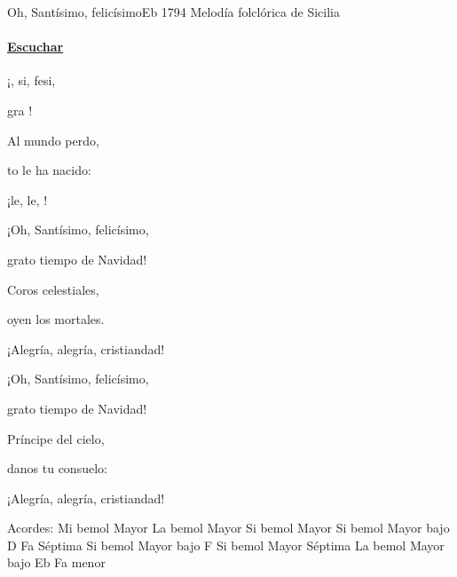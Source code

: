 \documentclass[12pt, spanish]{book}
\newcommand{\NotCCLIed}{\relax}
\begin{document}
    \begin{song}{Oh, Santísimo, felicísimo}{Eb}
    {1794} %
    {Melodía folclórica de Sicilia}
    {} %
    {} %
        \ifChordBk
            \paragraph{\mbox{}\hfill\protect\href{https://open.spotify.com/intl-es/track/0Mr8xSpK0KZLo99yfeLYA0}{Escuchar}\mbox{}\hfill}
        \fi

        \begin{SBOpGroup}
            ¡, si, fesi,

            gra   !

            Al mundo perdo,

            to le ha nacido:

            ¡le, le, !
        \end{SBOpGroup}
        \vskip 20pt
        \begin{SBOpGroup}
            ¡Oh, Santísimo, felicísimo,

            grato tiempo de Navidad!

            Coros celestiales,

            oyen los mortales.

            ¡Alegría, alegría, cristiandad!
        \end{SBOpGroup}
        \vskip 20pt
        \begin{SBOpGroup}
            ¡Oh, Santísimo, felicísimo,

            grato tiempo de Navidad!

            Príncipe del cielo,

            danos tu consuelo:

            ¡Alegría, alegría, cristiandad!
        \end{SBOpGroup}

        \ifChordBk
        \begin{SBOpGroup}
            Acordes:\break
            \upchord{\Eflat}\qquad Mi bemol Mayor \hfill
            \upchord{\Aflat}\qquad La bemol Mayor \hfill\null\break
            \upchord{\Bflat}\quad\quad Si bemol Mayor \hfill
            \upchord{\BflatD}Si bemol Mayor bajo D \hfill\null\break
            \upchord{\Fseven}\quad Fa S\'eptima \hfill
            \upchord{\BflatF}\quad Si bemol Mayor bajo F \hfill\null\break
            \upchord{\Bflatseven}\quad\quad Si bemol Mayor S\'eptima \hfill\null\break
            \upchord{\AflatEflat}\qquad La bemol Mayor bajo Eb \hfill
            \upchord{\Fm}\quad Fa menor \hfill\null\break
        \end{SBOpGroup}
        \fi
    \end{song}
\end{document}
